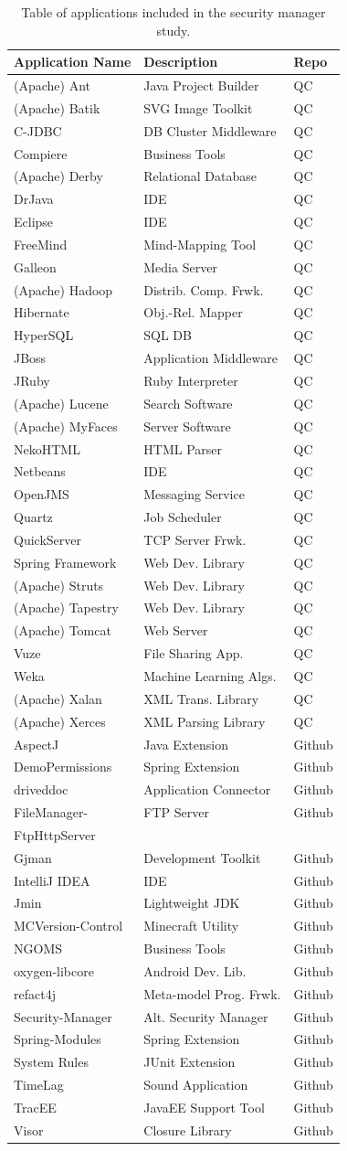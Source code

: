 \documentclass{sig-alternate}
\begin{document}
\begin{table}
\caption{Table of applications included in the security manager study.}
\label{Table:applications-studied}


\centering{}%
\begin{tabular}{lll}
\toprule 
Application Name & Description & Repo\tabularnewline
\midrule
(Apache) Ant & Java Project Builder & QC\tabularnewline
(Apache) Batik & SVG Image Toolkit & QC\tabularnewline
C-JDBC & DB Cluster Middleware & QC\tabularnewline
Compiere & Business Tools & QC\tabularnewline
(Apache) Derby & Relational Database & QC\tabularnewline
DrJava & IDE & QC\tabularnewline
Eclipse  & IDE & QC\tabularnewline
FreeMind & Mind-Mapping Tool & QC\tabularnewline
Galleon & Media Server & QC\tabularnewline
(Apache) Hadoop & Distrib. Comp. Frwk. & QC\tabularnewline
Hibernate & Obj.-Rel. Mapper & QC\tabularnewline
HyperSQL & SQL DB & QC\tabularnewline
JBoss & Application Middleware & QC\tabularnewline
JRuby & Ruby Interpreter & QC\tabularnewline
(Apache) Lucene & Search Software & QC\tabularnewline
(Apache) MyFaces & Server Software & QC\tabularnewline
NekoHTML & HTML Parser & QC\tabularnewline
Netbeans & IDE & QC\tabularnewline
OpenJMS & Messaging Service & QC\tabularnewline
Quartz  & Job Scheduler & QC\tabularnewline
QuickServer & TCP Server Frwk. & QC\tabularnewline
Spring Framework & Web Dev. Library & QC\tabularnewline
(Apache) Struts & Web Dev. Library & QC\tabularnewline
(Apache) Tapestry & Web Dev. Library & QC\tabularnewline
(Apache) Tomcat & Web Server & QC\tabularnewline
Vuze & File Sharing App. & QC\tabularnewline
Weka & Machine Learning Algs. & QC\tabularnewline
(Apache) Xalan & XML Trans. Library & QC\tabularnewline
(Apache) Xerces & XML Parsing Library & QC\tabularnewline
AspectJ & Java Extension & Github\tabularnewline
DemoPermissions & Spring Extension & Github\tabularnewline
driveddoc & Application Connector & Github\tabularnewline
FileManager- & FTP Server & Github \\ FtpHttpServer\tabularnewline
Gjman & Development Toolkit & Github\tabularnewline
IntelliJ IDEA & IDE & Github\tabularnewline
Jmin & Lightweight JDK & Github\tabularnewline
MCVersion-Control & Minecraft Utility & Github\tabularnewline
NGOMS & Business Tools & Github\tabularnewline
oxygen-libcore & Android Dev. Lib. & Github\tabularnewline
refact4j & Meta-model Prog. Frwk. & Github\tabularnewline
Security-Manager & Alt. Security Manager & Github\tabularnewline
Spring-Modules & Spring Extension & Github\tabularnewline
System Rules & JUnit Extension & Github\tabularnewline
TimeLag & Sound Application & Github\tabularnewline
TracEE & JavaEE Support Tool & Github\tabularnewline
Visor & Closure Library & Github\tabularnewline
\bottomrule
\end{tabular}
\end{table}
\end{document}
